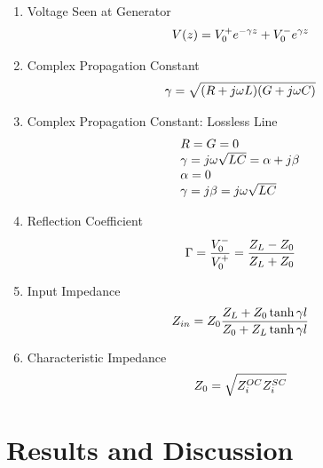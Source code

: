 \documentclass[conference]{IEEEtran}
\begin{document}
\begin{enumerate}
  \item Voltage Seen at Generator
    \begin{equation}{\label{eq:voltage_seen_at_generator}}
      V(z) = V_0^+ e^{-\gamma z} + V_0^- e^{\gamma z}
    \end{equation}

  \item Complex Propagation Constant
    \begin{equation}{\label{eq:propagation_constant}}
      \gamma = \sqrt{(R + j \omega L) (G + j \omega C)}\\
    \end{equation}

  \item Complex Propagation Constant: Lossless Line
    \begin{equation}{\label{eq:propagation_constant_lossless}}
      \begin{array}{ll}
        R = G = 0\\
        \gamma = j \omega \sqrt{L C} = \alpha + j \beta\\
        \alpha = 0\\
        \gamma = j \beta = j \omega \sqrt{LC}
      \end{array}
    \end{equation}

  \item Reflection Coefficient
    \begin{equation}{\label{eq:reflection_coefficient}}
      \Gamma = \frac{V_0^-}{V_0^+}=\frac{Z_L-Z_0}{Z_L+Z_0}
    \end{equation}

  \item Input Impedance
    \begin{equation}{\label{eq:z_in}}
      Z_{in} = Z_0 \frac{Z_L + Z_0 \tanh{\gamma l}}{Z_0 + Z_L \tanh{\gamma l}}
    \end{equation}

  \item Characteristic Impedance
    \begin{equation}{\label{eq:z_0}}
      Z_0 = \sqrt{Z_i^{OC} Z_i^{SC}}
    \end{equation}

\end{enumerate}

\section{Results and Discussion}
\end{document}
